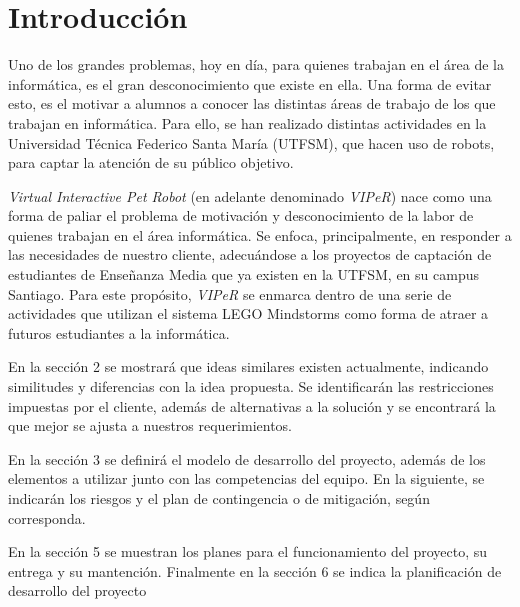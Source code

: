 \chapter{Introducci\'on}
Uno de los grandes problemas, hoy en d\'ia, para quienes trabajan en el \'area de la inform\'atica, es el gran desconocimiento que existe en ella. Una forma de evitar esto, es el motivar a alumnos a conocer las distintas \'areas de trabajo de los que trabajan en inform\'atica. Para ello, se han realizado distintas actividades en la Universidad T\'ecnica Federico Santa Mar\'ia (UTFSM), que hacen uso de robots, para captar la atenci\'on de su p\'ublico objetivo.

\emph{Virtual Interactive Pet Robot} (en adelante denominado \emph{VIPeR}) nace como una forma de paliar el problema de motivaci\'on y desconocimiento de la labor de quienes trabajan en el \'area inform\'atica. Se enfoca, principalmente, en responder a las necesidades de nuestro cliente, adecu\'andose a los proyectos de captaci\'on de estudiantes de Ense\~nanza Media que ya existen en la UTFSM, en su campus Santiago. Para este prop\'osito, \emph{VIPeR} se enmarca dentro de una serie de actividades que utilizan el sistema LEGO Mindstorms como forma de atraer a futuros estudiantes a la inform\'atica.

En la secci\'on 2 se mostrar\'a que ideas similares existen actualmente, indicando similitudes y diferencias con la idea propuesta. Se identificar\'an las restricciones impuestas por el cliente, adem\'as de alternativas a la soluci\'on y se encontrar\'a la que mejor se ajusta a nuestros requerimientos.

En la secci\'on 3 se definir\'a el modelo de desarrollo del proyecto, adem\'as de los elementos a utilizar junto con las competencias del equipo. En la siguiente, se indicar\'an los riesgos y el plan de contingencia o de mitigaci\'on, seg\'un corresponda.

En la secci\'on 5 se muestran los planes para el funcionamiento del proyecto, su entrega y su mantenci\'on. Finalmente en la secci\'on 6 se indica la planificaci\'on de desarrollo del proyecto
